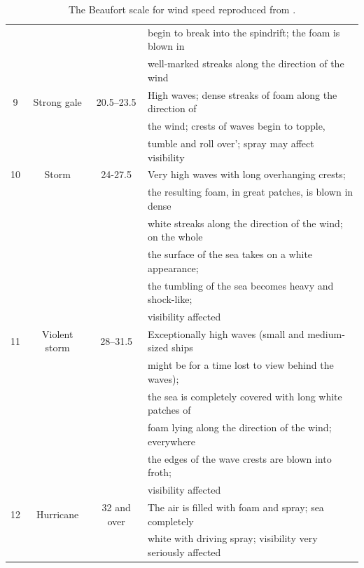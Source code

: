 \begin{table}
\begin{tabular}{|c|c|c|l|}
                &                 &                     & begin to break into the spindrift; the foam is blown in  \\
                &                &                    &  well-marked streaks along the direction of the wind  \\
9               & Strong gale     & 20.5--23.5         & High waves; dense streaks of foam along the direction of \\
                &                 &                    & the wind; crests of waves begin to topple, \\
                &                 &                    &tumble and roll over'; spray may affect visibility  \\
10              & Storm            & 24-27.5            & Very high waves with long overhanging crests; \\
                &                   &                  & the resulting foam, in great patches, is blown in dense \\
                &                  &                 & white streaks along the direction of the wind; on the whole \\
                &                  &                  & the surface of the sea takes on a white appearance; \\
                &                  &                  & the tumbling of the sea becomes heavy and shock-like; \\
                &                  &                  & visibility affected\\
11              & Violent storm    & 28--31.5           & Exceptionally high waves (small and medium-sized ships\\
                &                  &                    & might be for a time lost to view behind the waves); \\
                &                  &                    & the sea is completely covered with long white patches of \\
                &                  &                    & foam lying along the  direction of the wind; everywhere \\
                &                  &                    & the edges of the wave crests are blown into froth; \\
                &                  &                    &  visibility affected \\
12              & Hurricane        & 32 and over        &  The air is filled with foam and spray; sea completely \\
                &                  &                   &  white with driving spray; visibility very seriously affected  \\ 
\hline
\end{tabular}
\caption{The Beaufort scale for wind speed reproduced from \cite{Alcock&Morgan1978}. \label{table_beaufort}}
\label{table_Beaufort}
\end{table}

